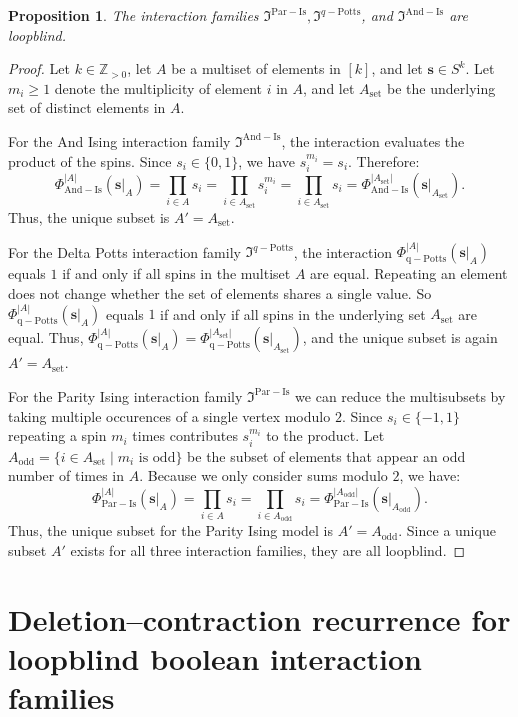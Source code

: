 \documentclass[11pt,reqno]{amsart}
\newcommand{\vecs}{\boldsymbol{s}}
\newcommand{\mci}{\mathfrak{I}^{\mathrm{Par-Is}}}
\newcommand{\mcp}{\mathfrak{I}^{q-\mathrm{Potts}}}
\newcommand{\mca}{\mathfrak{I}^{\mathrm{And-Is}}}
\theoremstyle{plain}
\newtheorem{proposition}[theorem]{Proposition}
\theoremstyle{definition}
\numberwithin{equation}{section}
\begin{document}
\begin{proposition}
    The interaction families $\mci, \mcp$, and $\mca$ are loopblind.
\end{proposition}
\begin{proof}
    Let $k \in \mathbb{Z}_{>0}$, let $A$ be a multiset of elements in $[k]$, and let $\vecs \in S^k$. Let $m_i \geq 1$ denote the multiplicity of element $i$ in $A$, and let $A_{\mathrm{set}}$ be the underlying set of distinct elements in $A$.

    For the And Ising interaction family $\mca$, the interaction evaluates the product of the spins. Since $s_i \in \{0,1\}$, we have $s_i^{m_i} = s_i$. Therefore:
    \[ \Phi^{|A|}_{\mathrm{And-Is}}(\vecs|_A) = \prod_{i \in A} s_i = \prod_{i \in A_{\mathrm{set}}} s_i^{m_i} = \prod_{i \in A_{\mathrm{set}}} s_i = \Phi^{|A_{\mathrm{set}}|}_{\mathrm{And-Is}}(\vecs|_{A_{\mathrm{set}}}). \]
    Thus, the unique subset is $A' = A_{\mathrm{set}}$.

    For the Delta Potts interaction family $\mcp$, the interaction $\Phi^{|A|}_{\mathrm{q-Potts}}(\vecs|_A)$ equals $1$ if and only if all spins in the multiset $A$ are equal. Repeating an element does not change whether the set of elements shares a single value. So $\Phi^{|A|}_{\mathrm{q-Potts}}(\vecs|_A)$ equals $1$ if and only if all spins in the underlying set $A_{\mathrm{set}}$ are equal. Thus, $\Phi^{|A|}_{\mathrm{q-Potts}}(\vecs|_A) = \Phi^{|A_{\mathrm{set}}|}_{\mathrm{q-Potts}}(\vecs|_{A_{\mathrm{set}}})$, and the unique subset is again $A' = A_{\mathrm{set}}$.

    For the Parity Ising interaction family $\mci$ we can reduce the multisubsets by taking multiple occurences of a single vertex modulo $2$. Since $s_i \in \{-1,1\}$ repeating a spin $m_i$ times contributes $s_i^{m_i}$ to the product. Let $A_{\mathrm{odd}} = \{i \in A_{\mathrm{set}} \mid m_i \text{ is odd} \}$ be the subset of elements that appear an odd number of times in $A$. Because we only consider sums modulo $2$, we have:
    \[ \Phi^{|A|}_{\mathrm{Par-Is}}(\vecs|_A) = \prod_{i \in A} s_i = \prod_{i \in  A_{\mathrm{odd}}} s_i = \Phi^{|A_{\mathrm{odd}}|}_{\mathrm{Par-Is}}(\vecs|_{A_{\mathrm{odd}}}). \]
    Thus, the unique subset for the Parity Ising model is $A' = A_{\mathrm{odd}}$.
    Since a unique subset $A'$ exists for all three interaction families, they are all loopblind.
\end{proof}

\section{Deletion--contraction recurrence for loopblind boolean interaction families}
\label{sec:delcon}
\end{document}
